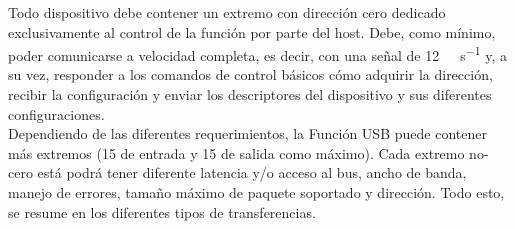 	Todo dispositivo debe contener un extremo con dirección cero dedicado exclusivamente al control de la función por parte del host. Debe, como mínimo, poder comunicarse a velocidad completa, es decir, con una señal de \SI{12}{\mega\bit\per\second} y, a su vez, responder a los comandos de control básicos cómo adquirir la dirección, recibir la configuración y enviar los descriptores del dispositivo y sus diferentes configuraciones.\\
	
	Dependiendo de las diferentes requerimientos, la Función USB puede contener más extremos (15 de entrada y 15 de salida como máximo). Cada extremo no-cero está podrá tener diferente latencia y/o acceso al bus, ancho de banda, manejo de errores, tamaño máximo de paquete soportado y dirección. Todo esto, se resume en los diferentes tipos de transferencias.\\
	
	
	
